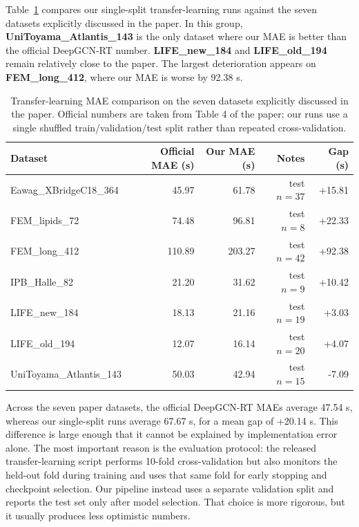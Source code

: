 Table~\ref{tab:transfer-seven} compares our single-split transfer-learning runs against the seven datasets explicitly discussed in the paper. In this group, \textbf{UniToyama\_Atlantis\_143} is the only dataset where our MAE is better than the official DeepGCN-RT number. \textbf{LIFE\_new\_184} and \textbf{LIFE\_old\_194} remain relatively close to the paper. The largest deterioration appears on \textbf{FEM\_long\_412}, where our MAE is worse by 92.38 s.

\begin{table}[t]
    \centering
    \caption{Transfer-learning MAE comparison on the seven datasets explicitly discussed in the paper. Official numbers are taken from Table 4 of the paper; our runs use a single shuffled train/validation/test split rather than repeated cross-validation.}
    \label{tab:transfer-seven}
    \begin{tabular}{lrrrr}
        \toprule
        Dataset                  & Official MAE (s) & Our MAE (s) & Notes         & Gap (s) \\
        \midrule
        Eawag\_XBridgeC18\_364   & 45.97            & 61.78       & test \(n=37\) & +15.81  \\
        FEM\_lipids\_72          & 74.48            & 96.81       & test \(n=8\)  & +22.33  \\
        FEM\_long\_412           & 110.89           & 203.27      & test \(n=42\) & +92.38  \\
        IPB\_Halle\_82           & 21.20            & 31.62       & test \(n=9\)  & +10.42  \\
        LIFE\_new\_184           & 18.13            & 21.16       & test \(n=19\) & +3.03   \\
        LIFE\_old\_194           & 12.07            & 16.14       & test \(n=20\) & +4.07   \\
        UniToyama\_Atlantis\_143 & 50.03            & 42.94       & test \(n=15\) & -7.09   \\
        \bottomrule
    \end{tabular}
\end{table}

Across the seven paper datasets, the official DeepGCN-RT MAEs average 47.54 s, whereas our single-split runs average 67.67 s, for a mean gap of +20.14 s. This difference is large enough that it cannot be explained by implementation error alone. The most important reason is the evaluation protocol: the released transfer-learning script performs 10-fold cross-validation but also monitors the held-out fold during training and uses that same fold for early stopping and checkpoint selection. Our pipeline instead uses a separate validation split and reports the test set only after model selection. That choice is more rigorous, but it usually produces less optimistic numbers.

